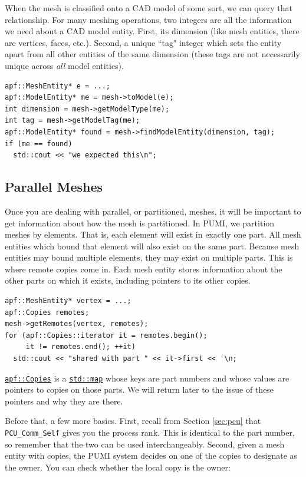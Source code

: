 \documentclass{article}
\begin{document}
When the mesh is classified onto a CAD model of some sort, we
can query that relationship.
For many meshing operations, two integers are all the information
we need about a CAD model entity.
First, its dimension (like mesh entities, there are vertices, faces, etc.).
Second, a unique ``tag" integer which sets the entity apart from
all other entities of the same dimension (these tags are not necessarily
unique across \emph{all} model entities).

\begin{lstlisting}
apf::MeshEntity* e = ...;
apf::ModelEntity* me = mesh->toModel(e);
int dimension = mesh->getModelType(me);
int tag = mesh->getModelTag(me);
apf::ModelEntity* found = mesh->findModelEntity(dimension, tag);
if (me == found)
  std::cout << "we expected this\n";
\end{lstlisting}

\subsection{Parallel Meshes}

Once you are dealing with parallel, or partitioned, meshes,
it will be important to get information about how the
mesh is partitioned.
In PUMI, we partition meshes by elements.
That is, each element will exist in exactly one part.
All mesh entities which bound that element will also exist on
the same part.
Because mesh entities may bound multiple elements, they may
exist on multiple parts.
This is where remote copies come in.
Each mesh entity stores information about the other parts
on which it exists, including pointers to its other copies.

\begin{lstlisting}
apf::MeshEntity* vertex = ...;
apf::Copies remotes;
mesh->getRemotes(vertex, remotes);
for (apf::Copies::iterator it = remotes.begin();
     it != remotes.end(); ++it)
  std::cout << "shared with part " << it->first << '\n;
\end{lstlisting}

\href{http://scorec.rpi.edu/~dibanez/core/namespaceapf.html#a4fdcb1e40963596d8345f0328e7d65b1}{\texttt{apf::Copies}}
is a
\href{http://www.cplusplus.com/reference/map/map/}{\texttt{std::map}}
whose keys are part numbers and whose
values are pointers to copies on those parts.
We will return later to the issue of these pointers and
why they are there.

Before that, a few more basics.
First, recall from Section \ref{sec:pcu} that \texttt{PCU\_Comm\_Self}
gives you the process rank.
This is identical to the part number, so remember that the two
can be used interchangeably.
Second, given a mesh entity with copies, the PUMI system decides
on one of the copies to designate as the owner.
You can check whether the local copy is the owner:
\end{document}
